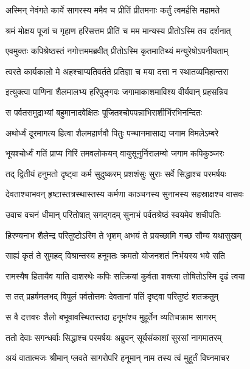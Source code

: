 \twolineshloka
{अस्मिन् नेवंगते कार्ये सागरस्य ममैव च}
{प्रीतिं प्रीतमनाः कर्तुं त्वमर्हसि महामते} %

\twolineshloka
{श्रमं मोक्षय पूजां च गृहाण हरिसत्तम}
{प्रीतिं च मम मान्यस्य प्रीतोऽस्मि तव दर्शनात्} %

\twolineshloka
{एवमुक्तः कपिश्रेष्ठस्तं नगोत्तममब्रवीत्}
{प्रीतोऽस्मि कृतमातिथ्यं मन्युरेषोऽपनीयताम्} %

\twolineshloka
{त्वरते कार्यकालो मे अहश्चाप्यतिवर्तते}
{प्रतिज्ञा च मया दत्ता न स्थातव्यमिहान्तरा} %

\twolineshloka
{इत्युक्त्वा पाणिना शैलमालभ्य हरिपुङ्गवः}
{जगामाकाशमाविश्य वीर्यवान् प्रहसन्निव} %

\twolineshloka
{स पर्वतसमुद्राभ्यां बहुमानादवेक्षितः}
{पूजितश्चोपपन्नाभिराशीर्भिरभिनन्दितः} %

\twolineshloka
{अथोर्ध्वं दूरमागत्य हित्वा शैलमहार्णवौ}
{पितुः पन्थानमासाद्य जगाम विमलेऽम्बरे} %

\twolineshloka
{भूयश्चोर्ध्वं गतिं प्राप्य गिरिं तमवलोकयन्}
{वायुसूनुर्निरालम्बो जगाम कपिकुञ्जरः} %

\twolineshloka
{तद् द्वितीयं हनुमतो दृष्ट्वा कर्म सुदुष्करम्}
{प्रशशंसुः सुराः सर्वे सिद्धाश्च परमर्षयः} %

\twolineshloka
{देवताश्चाभवन् हृष्टास्तत्रस्थास्तस्य कर्मणा}
{काञ्चनस्य सुनाभस्य सहस्राक्षश्च वासवः} %

\twolineshloka
{उवाच वचनं धीमान् परितोषात् सगद्गदम्}
{सुनाभं पर्वतश्रेष्ठं स्वयमेव शचीपतिः} %

\twolineshloka
{हिरण्यनाभ शैलेन्द्र परितुष्टोऽस्मि ते भृशम्}
{अभयं ते प्रयच्छामि गच्छ सौम्य यथासुखम्} %

\twolineshloka
{साह्यं कृतं ते सुमहद् विश्रान्तस्य हनूमतः}
{क्रमतो योजनशतं निर्भयस्य भये सति} %

\twolineshloka
{रामस्यैष हितायैव याति दाशरथेः कपिः}
{सत्क्रियां कुर्वता शक्त्या तोषितोऽस्मि दृढं त्वया} %

\twolineshloka
{स तत् प्रहर्षमलभद् विपुलं पर्वतोत्तमः}
{देवतानां पतिं दृष्ट्वा परितुष्टं शतक्रतुम्} %

\twolineshloka
{स वै दत्तवरः शैलो बभूवावस्थितस्तदा}
{हनूमांश्च मुहूर्तेन व्यतिचक्राम सागरम्} %

\twolineshloka
{ततो देवाः सगन्धर्वाः सिद्धाश्च परमर्षयः}
{अब्रुवन् सूर्यसंकाशां सुरसां नागमातरम्} %

\twolineshloka
{अयं वातात्मजः श्रीमान् प्लवते सागरोपरि}
{हनूमान् नाम तस्य त्वं मुहूर्तं विघ्नमाचर} %

